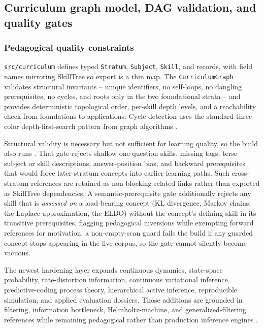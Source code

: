 \documentclass[
  english,
]{article}
\begin{document}
\subsection{Curriculum graph model, DAG validation, and quality
gates}\label{curriculum-graph-model-dag-validation-and-quality-gates}

\subsubsection{Pedagogical quality
constraints}\label{pedagogical-quality-constraints}

\texttt{src/curriculum} defines typed \texttt{Stratum},
\texttt{Subject}, \texttt{Skill}, and 
records, with field names mirroring SkillTree so export is a thin map.
The \texttt{CurriculumGraph} validates structural invariants -- unique
identifiers, no self-loops, no dangling prerequisites, no cycles, and
roots only in the two foundational strata -- and provides deterministic
topological order, per-skill depth levels, and a reachability check from
foundations to applications. Cycle detection uses the standard
three-color depth-first-search pattern from graph algorithms
\citep{cormen2022introduction}.

Structural validity is necessary but not sufficient for learning
quality, so the build also runs . That
gate rejects shallow one-question skills, missing tags, terse subject or
skill descriptions, answer-position bias, and backward prerequisites
that would force later-stratum concepts into earlier learning paths.
Such cross-stratum references are retained as non-blocking related links
rather than exported as SkillTree dependencies. A semantic-prerequisite
gate additionally rejects any skill that is \emph{assessed on} a
load-bearing concept (KL divergence, Markov chains, the Laplace
approximation, the ELBO) without the concept's defining skill in its
transitive prerequisites, flagging pedagogical inversions while
exempting forward references for motivation; a non-empty-scan guard
fails the build if any guarded concept stops appearing in the live
corpus, so the gate cannot silently become vacuous.

The newest hardening layer expands continuous dynamics, state-space
probability, rate-distortion information, continuous variational
inference, predictive-coding process theory, hierarchical active
inference, reproducible simulation, and applied evaluation dossiers.
Those additions are grounded in filtering, information bottleneck,
Helmholtz-machine, and generalized-filtering references while remaining
pedagogical rather than production inference engines
\citep{sarkka2013bayesian, tishby1999information, dayan1995helmholtz, friston2010generalised}.
\end{document}
